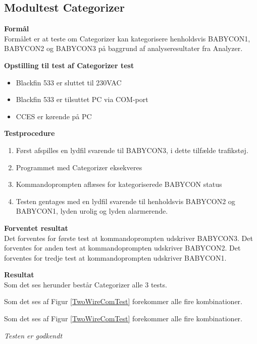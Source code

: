 \subsection{Modultest Categorizer}

\textbf{Formål} \\
Formålet er at teste om Categorizer kan kategorisere henholdsvis BABYCON1, BABYCON2 og BABYCON3 på baggrund af analyseresultater fra Analyzer.

\textbf{Opstilling til test af Categorizer test}

\begin{itemize}
	\item Blackfin 533 er sluttet til 230VAC
	\item Blackfin 533 er tilsuttet PC via COM-port
	\item CCES er kørende på PC
\end{itemize}

\textbf{Testprocedure}
\begin{enumerate}
	\item Først afspilles en lydfil svarende til BABYCON3, i dette tilfælde trafikstøj.
	\item Programmet med Categorizer eksekveres 
	\item Kommandoprompten aflæses for kategoriserede BABYCON status
	\item Testen gentages med en lydfil svarende til henholdsvis BABYCON2 og BABYCON1, lyden urolig og lyden alarmerende. 
\end{enumerate}

\textbf{Forventet resultat} \\
Det forventes for første test at kommandoprompten udskriver BABYCON3.
Det forventes for anden test at kommandoprompten udskriver BABYCON2.
Det forventes for tredje test at kommandoprompten udskriver BABYCON1. 

\textbf{Resultat} \\
Som det ses herunder består Categorizer alle 3 tests. 


Som det ses af Figur \ref{TwoWireComTest} forekommer alle fire kombinationer. \\


Som det ses af Figur \ref{TwoWireComTest} forekommer alle fire kombinationer. \\


\textit{Testen er godkendt}